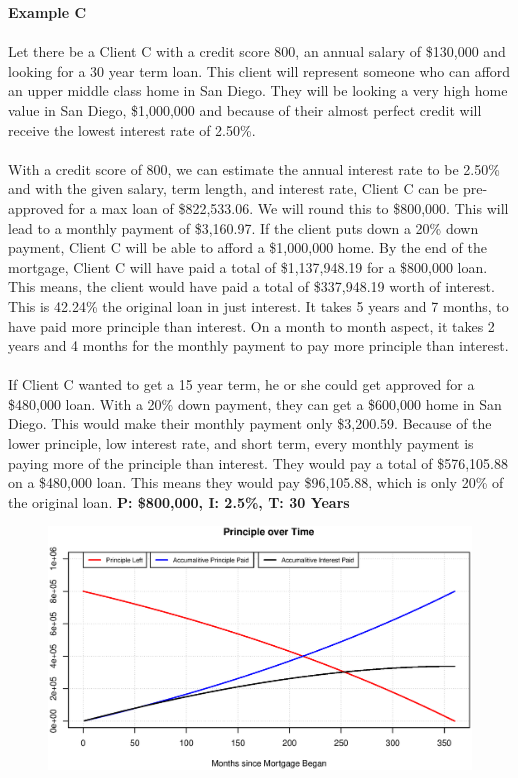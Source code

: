 \documentclass[12pt]{article}
\newenvironment{Section}[1]{}{\newpage}
\begin{document}
	\begin{Section}{Example C}
		\textbf{\Huge Example C}
		\\ \\
		Let there be a Client C with a credit score 800, an annual salary of \$130,000 and looking for a 30 year term loan. This client will represent someone who can afford an upper middle class home in San Diego.  They will be looking a very high home value in San Diego, \$1,000,000 and because of their almost perfect credit will receive the lowest interest rate of 2.50\%.
		\\ \\
		With a credit score of 800, we can estimate the annual interest rate to be 2.50\% and with the given salary, term length, and interest rate, Client C can be pre-approved for a max loan of \$822,533.06.  We will round this to \$800,000.  This will lead to a monthly payment of \$3,160.97. If the client puts down a 20\% down payment, Client C will be able to afford a \$1,000,000 home.  By the end of the mortgage, Client C will have paid a total of \$1,137,948.19 for a \$800,000 loan. This means, the client would have paid a total of \$337,948.19 worth of interest.  This is 42.24\% the original loan in just interest.  It takes 5 years and 7 months, to have paid more principle than interest.  On a month to month aspect, it takes 2 years and 4 months for the monthly payment to pay more principle than interest. 
		\\ \\
		If Client C wanted to get a 15 year term, he or she could get approved for a \$480,000 loan.  With a 20\% down payment, they can get a \$600,000 home in San Diego.  This would make their monthly payment only \$3,200.59.  Because of the lower principle, low interest rate, and short term, every monthly payment is paying more of the principle than interest.  They would pay a total of \$576,105.88 on a \$480,000 loan.  This means they would pay \$96,105.88, which is only 20\% of the original loan.       
		\newpage
		\textbf{\Large P: \$800,000, I: 2.5\%, T: 30 Years}
		\begin{figure}[h!]
			\centering
			\includegraphics[width = \linewidth]{Figures/POT.C800.S130.T30}

\end{figure}
\end{Section}
\end{document}
